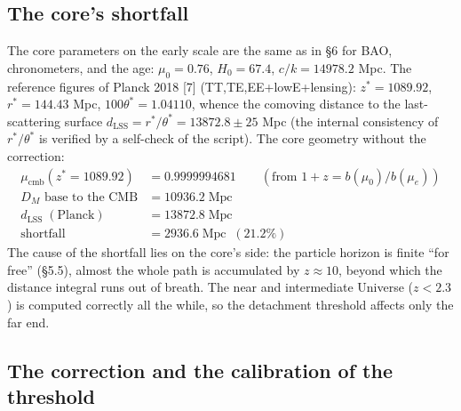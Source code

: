 \documentclass{article}
\begin{document}
\subsection{The core's shortfall}

The core parameters on the early scale are the same as in \S6 for BAO, chronometers, and the age: $\mu_0 = 0.76$, $H_0 = 67.4$, $c/k = 14978.2$ Mpc. The reference figures of Planck 2018 [7] (TT,TE,EE+lowE+lensing): $z^* = 1089.92$, $r^* = 144.43$ Mpc, $100\theta^* = 1.04110$, whence the comoving distance to the last-scattering surface $d_{\text{LSS}} = r^*/\theta^* = 13872.8 \pm 25$ Mpc (the internal consistency of $r^*/\theta^*$ is verified by a self-check of the script). The core geometry without the correction:
\begin{align*}
\mu_{\text{cmb}}(z^* = 1089.92) &= 0.9999994681 \qquad (\text{from } 1+z = b(\mu_0)/b(\mu_e)) \\
D_M \text{ base to the CMB} &= 10936.2\;\text{Mpc} \\
d_{\text{LSS}}\;(\text{Planck}) &= 13872.8\;\text{Mpc} \\
\text{shortfall} &= 2936.6\;\text{Mpc} \;\;(21.2\%)
\end{align*}
The cause of the shortfall lies on the core's side: the particle horizon is finite ``for free'' (\S5.5), almost the whole path is accumulated by $z \approx 10$, beyond which the distance integral runs out of breath. The near and intermediate Universe ($z < 2.3$) is computed correctly all the while, so the detachment threshold affects only the far end.

\subsection{The correction and the calibration of the threshold}
\end{document}
